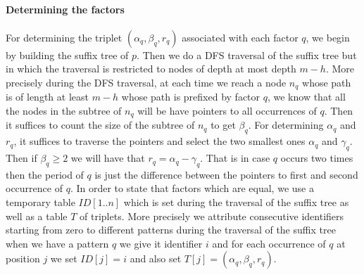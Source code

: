 \documentclass{article}
\newcommand{\?}{\mskip1.5mu}
\begin{document}
\paragraph{Determining the factors}
For determining the triplet $(\alpha_q,\beta_q,r_q)$ associated with each factor $q$, we begin by building the suffix tree of $p$. Then we do a DFS 	traversal of the suffix tree but in which the traversal is restricted to nodes of depth at most depth $m-h$. More precisely during the DFS traversal, at each time we reach a node $n_q$ whose path is of length at least $m-h$ whose path is prefixed by factor $q$, we know that all the nodes in the subtree of $n_q$ will be have pointers to all occurrences of $q$. Then it suffices to count the size of the subtree of $n_q$ to get $\beta_q$. For determining $\alpha_q$ and $r_q$, it suffices to traverse the pointers and select the two smallest ones $\alpha_q$ and $\gamma_q$. Then if $\beta_q\geq 2$ we will have that $r_q=\alpha_q-\gamma_q$. That is in case $q$ occurs two times then the period of $q$ is just the difference between the pointers to first and second occurrence of $q$. In order to state that factors which are equal, we use a temporary table $ID[1..n]$ which is set during the traversal of the suffix tree as well as a table $T$ of triplets. More precisely we attribute consecutive identifiers starting from zero to different patterns during the traversal of the suffix tree when we have a pattern $q$ we give it identifier $i$ and for each occurrence of $q$ at position $j$ we set $ID[j]=i$ and also set $T[j]=(\alpha_q,\beta_q,r_q)$.
\end{document}
